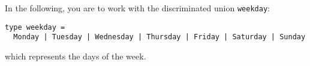 In the following, you are to work with the discriminated union \texttt{weekday}:
\begin{lstlisting}
type weekday =
  Monday | Tuesday | Wednesday | Thursday | Friday | Saturday | Sunday
\end{lstlisting}
which represents the days of the week.
